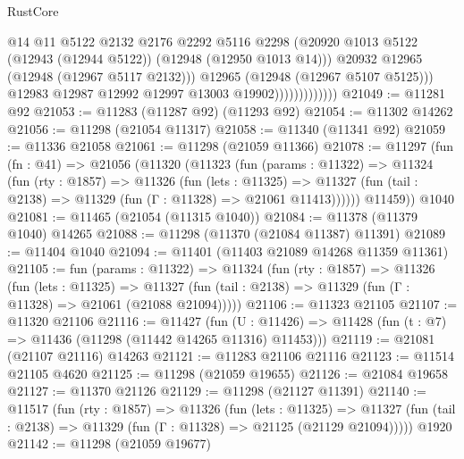 \begin{lexlean}{RustCore}
\begin{coremodule}
                                  @14
                                  @11
                                  @5122
                                  @2132
                                  @2176
                                  @2292
                                  @5116
                                  @2298
                                  (@20920
                                    @1013
                                    @5122
                                    (@12943 (@12944 @5122))
                                    (@12948 (@12950 @1013 @14)))
                                  @20932
                                  @12965
                                  (@12948 (@12967 @5117 @2132)))
                                @12965
                                (@12948 (@12967 @5107 @5125)))
                              @12983
                              @12987
                              @12992
                              @12997
                              @13003
                              @19902)))))))))))))
@21049 := @11281 @92
@21053 := @11283 (@11287 @92) (@11293 @92)
@21054 := @11302 @14262
@21056 := @11298 (@21054 @11317)
@21058 := @11340 (@11341 @92)
@21059 := @11336 @21058
@21061 := @11298 (@21059 @11366)
@21078 := @11297
    (fun (fn : @41) =>
    @21056
      (@11320
        (@11323
          (fun (params : @11322) =>
          @11324
            (fun (rty : @1857) =>
            @11326
              (fun (lets : @11325) =>
              @11327 (fun (tail : @2138) => @11329 (fun (Γ : @11328) => @21061 @11413))))))
        @11459))
    @1040
@21081 := @11465 (@21054 (@11315 @1040))
@21084 := @11378 (@11379 @1040) @14265
@21088 := @11298 (@11370 (@21084 @11387) @11391)
@21089 := @11404 @1040
@21094 := @11401 (@11403 @21089 @14268 @11359 @11361)
@21105 := fun (params : @11322) =>
  @11324
    (fun (rty : @1857) =>
    @11326
      (fun (lets : @11325) =>
      @11327 (fun (tail : @2138) => @11329 (fun (Γ : @11328) => @21061 (@21088 @21094)))))
@21106 := @11323 @21105
@21107 := @11320 @21106
@21116 := @11427
    (fun (U : @11426) => @11428 (fun (t : @7) => @11436 (@11298 (@11442 @14265 @11316) @11453)))
@21119 := @21081 (@21107 @21116) @14263
@21121 := @11283 @21106 @21116
@21123 := @11514 @21105 @4620
@21125 := @11298 (@21059 @19655)
@21126 := @21084 @19658
@21127 := @11370 @21126
@21129 := @11298 (@21127 @11391)
@21140 := @11517
    (fun (rty : @1857) =>
    @11326
      (fun (lets : @11325) =>
      @11327 (fun (tail : @2138) => @11329 (fun (Γ : @11328) => @21125 (@21129 @21094)))))
    @1920
@21142 := @11298 (@21059 @19677)

\end{coremodule}
\end{lexlean}
